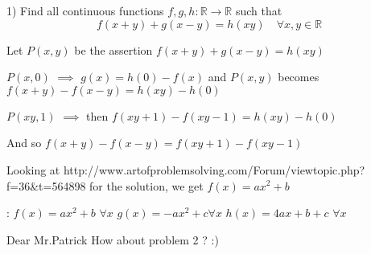 \begin{solution}
	\begin{tcolorbox}1) Find all continuous functions $f,g,h:\mathbb{R}\to\mathbb{R}$ such that 
\[f(x+y)+g(x-y)=h(xy)\quad \forall x,y\in\mathbb{R}\]\end{tcolorbox}
Let $P(x,y)$ be the assertion $f(x+y)+g(x-y)=h(xy)$

$P(x,0)$ $\implies$ $g(x)=h(0)-f(x)$ and $P(x,y)$ becomes $f(x+y)-f(x-y)=h(xy)-h(0)$

$P(xy,1)$ $\implies$ then $f(xy+1)-f(xy-1)=h(xy)-h(0)$

And so $f(x+y)-f(x-y)=f(xy+1)-f(xy-1)$

Looking at http://www.artofproblemsolving.com/Forum/viewtopic.php?f=36&t=564898 for the solution, we get $f(x)=ax^2+b$

 :
$f(x)=ax^2+b$ $\forall x$
$g(x)=-ax^2+c$$\forall x$
$h(x)=4ax+b+c$ $\forall x$
\end{solution}



\begin{solution}
	Dear Mr.Patrick 
How about problem 2 ? :)
\end{solution}



